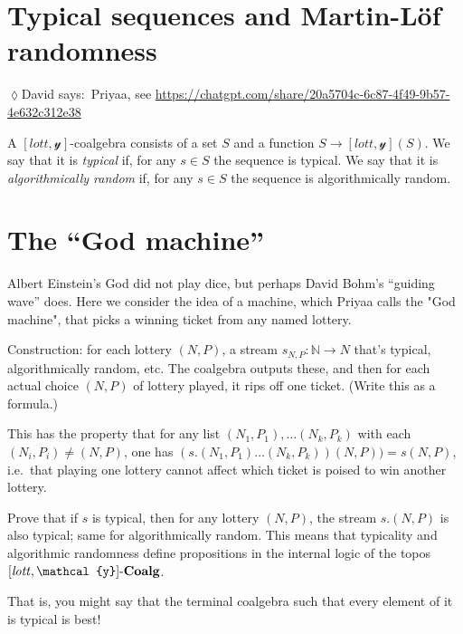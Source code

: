 \documentclass[11pt]{article}
\newcommand{\Cat}[1]{\mathbf{#1}}%
\newcommand{\tn}[1]{\textnormal{#1}}
\newcommand{\nn}{\mathbb{N}}
\newcommand{\coalg}{\tn{-}\Cat{Coalg}}
\newcommand{\lott}{\mathit{lott}}
\newcommand{\yon}{\mathcal{y}}
\newcommand{\dnote}[1]{{\quad \color{blue}$\lozenge$\;David says:}~#1\;{\color{blue}$\lozenge$}\quad}
\begin{document}
\section{Typical sequences and Martin-L\"of randomness}

\dnote{Priyaa, see \url{https://chatgpt.com/share/20a5704c-6c87-4f49-9b57-4e632c312e38}}

A $[\lott,\yon]$-coalgebra consists of a set $S$ and a function $S\to[\lott,\yon](S)$. We say that it is \emph{typical} if, for any $s\in S$ the sequence is typical. We say that it is \emph{algorithmically random} if, for any $s\in S$ the sequence is algorithmically random.




\section{The ``God machine''}

Albert Einstein's God did not play dice, but perhaps David Bohm's ``guiding wave'' does. Here we consider the idea of a machine, which Priyaa calls the "God machine", that picks a winning ticket from any named lottery. 

Construction: for each lottery $(N,P)$, a stream $s_{N,P}:\nn\to N$ that's typical, algorithmically random, etc. The coalgebra outputs these, and then for each actual choice $(N,P)$ of lottery played, it rips off one ticket. (Write this as a formula.)

This has the property that for any list $(N_1,P_1),\ldots(N_k,P_k)$ with each $(N_i,P_i)\neq (N,P)$, one has $(s.(N_1,P_1)\ldots(N_k,P_k))(N,P))=s(N,P)$, i.e.\ that playing one lottery cannot affect which ticket is poised to win another lottery. 

Prove that if $s$ is typical, then for any lottery $(N,P)$, the stream $s.(N,P)$ is also typical; same for algorithmically random. This means that typicality and algorithmic randomness define propositions in the internal logic of the topos $[\lott,\yon]\coalg$.

That is, you might say that the terminal coalgebra such that every element of it is typical is best!
\end{document}
